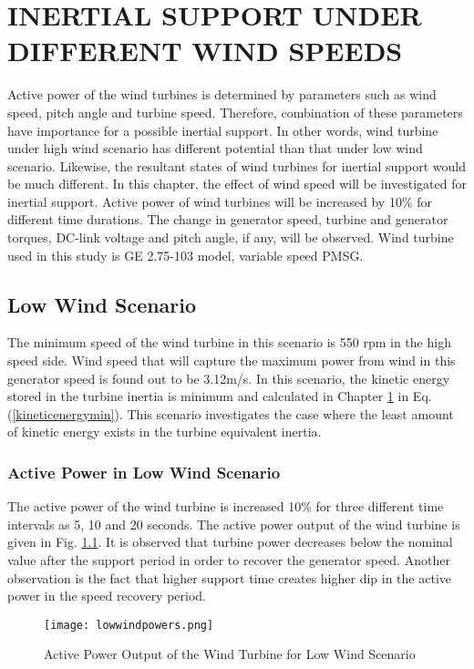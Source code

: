 \chapter{INERTIAL SUPPORT UNDER DIFFERENT WIND SPEEDS}
\label{chp:4}
Active power of the wind turbines is determined by parameters such as wind speed, pitch angle and turbine speed. Therefore, combination of these parameters have importance for a possible inertial support. In other words, wind turbine under high wind scenario has different potential than that under low wind scenario. Likewise, the resultant states of wind turbines for inertial support would be much different. In this chapter, the effect of wind speed will be investigated for inertial support. Active power of wind turbines will be increased by 10\% for different time durations. The change in generator speed, turbine and generator torques, DC-link voltage and pitch angle, if any, will be observed. Wind turbine used in this study is GE 2.75-103 model, variable speed PMSG.
\section{Low Wind Scenario}
\label{sec:lowwind}
The minimum speed of the wind turbine in this scenario is 550 rpm in the high speed side. Wind speed that will capture the maximum power from wind in this generator speed is found out to be 3.12m/s. In this scenario, the kinetic energy stored in the turbine inertia is minimum and calculated in Chapter \ref{chp:4} in Eq. (\ref{kineticenergymin}). This scenario investigates the case where the least amount of kinetic energy exists in the turbine equivalent inertia.\par
\subsection{Active Power in Low Wind Scenario}
The active power of the wind turbine is increased 10\% for three different time intervals as 5, 10 and 20 seconds. The active power output of the wind turbine is given in Fig. \ref{lowactivepowers}. It is observed that turbine power decreases below the nominal value after the support period in order to recover the generator speed. Another observation is the fact that higher support time creates higher dip in the active power in the speed recovery period.\par
\begin{figure}[h!]
	\centering
	\texttt{[image: lowwindpowers.png]}
	\caption{Active Power Output of the Wind Turbine for Low Wind Scenario}
	\label{lowactivepowers}
\end{figure}
